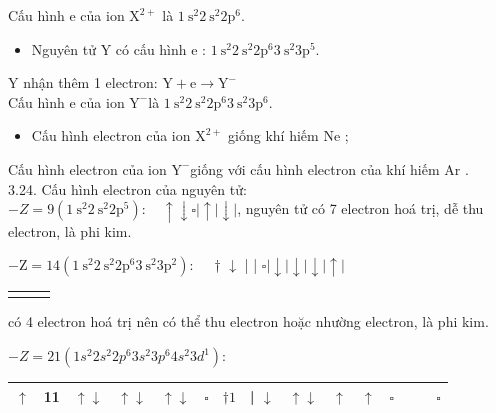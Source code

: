 \documentclass[10pt]{article}
\begin{document}
Cấu hình e của ion $\mathrm{X}^{2+}$ là $1 \mathrm{~s}^{2} 2 \mathrm{~s}^{2} 2 \mathrm{p}^{6}$.

\begin{itemize}
  \item Nguyên tử Y có cấu hình e : $1 \mathrm{~s}^{2} 2 \mathrm{~s}^{2} 2 \mathrm{p}^{6} 3 \mathrm{~s}^{2} 3 \mathrm{p}^{5}$.
\end{itemize}

Y nhận thêm 1 electron: $\mathrm{Y}+\mathrm{e} \rightarrow \mathrm{Y}^{-}$\\
Cấu hình e của ion $\mathrm{Y}^{-}$là $1 \mathrm{~s}^{2} 2 \mathrm{~s}^{2} 2 \mathrm{p}^{6} 3 \mathrm{~s}^{2} 3 \mathrm{p}^{6}$.

\begin{itemize}
  \item Cấu hình electron của ion $\mathrm{X}^{2+}$ giống khí hiếm Ne ;
\end{itemize}

Cấu hình electron của ion $\mathrm{Y}^{-}$giống với cấu hình electron của khí hiếm Ar .\\
3.24. Cấu hình electron của nguyên tử:\\
$-Z=9\left(1 \mathrm{~s}^{2} 2 \mathrm{~s}^{2} 2 \mathrm{p}^{5}\right): \quad \uparrow \downarrow \square|\uparrow| \downarrow \mid$, nguyên tử có 7 electron hoá trị, dễ thu electron, là phi kim.

$-\mathrm{Z}=14\left(1 \mathrm{~s}^{2} 2 \mathrm{~s}^{2} 2 \mathrm{p}^{6} 3 \mathrm{~s}^{2} 3 \mathrm{p}^{2}\right): \quad$ † $\downarrow$ | | $\square|\downarrow| \downarrow|\downarrow| \uparrow |$\begin{tabular}{|l|l|l|}
\hline
 &  &  \\
\hline
 &  &  \\
\hline
\end{tabular} có 4 electron hoá trị nên có thể thu electron hoặc nhường electron, là phi kim.

$-Z=21\left(1 s^{2} 2 s^{2} 2 p^{6} 3 s^{2} 3 p^{6} 4 s^{2} 3 d^{1}\right):$

\begin{center}
\begin{tabular}{|l|l|l|l|l|l|l|l|l|l|l|l|l|l|l|l|}
\hline
$\uparrow$ & 11 & $\uparrow \downarrow$ & $\uparrow \downarrow$ & $\uparrow \downarrow$ & $\square$ & $\dagger 1$ & | $\downarrow$ & $\uparrow \downarrow$ & $\uparrow$ & $\uparrow$ & $\square$ &  & \multicolumn{2}{|c|}{} & $\square$ \\
\hline
\end{tabular}
\end{center}
\end{document}
